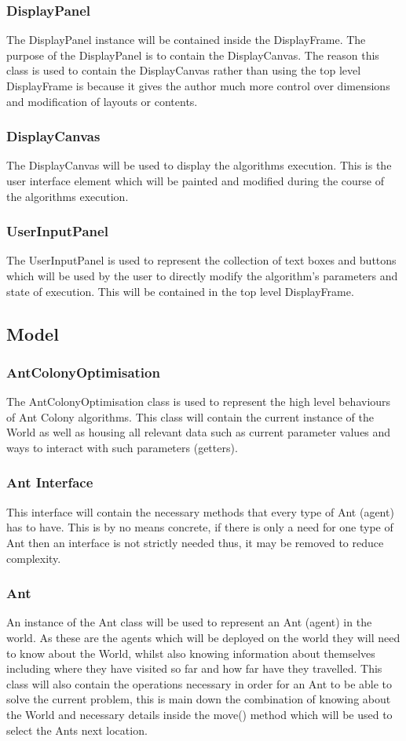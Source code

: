 \subsubsection{DisplayPanel}
The DisplayPanel instance will be contained inside the DisplayFrame. The purpose of the DisplayPanel is to contain the DisplayCanvas. The reason this class is used to contain the DisplayCanvas rather than using the top level DisplayFrame is because it gives the author much more control over dimensions and modification of layouts or contents.
\subsubsection{DisplayCanvas}
The DisplayCanvas will be used to display the algorithms execution. This is the user interface element which will be painted and modified during the course of the algorithms execution.
\subsubsection{UserInputPanel}
The UserInputPanel is used to represent the collection of text boxes and buttons which will be used by the user to directly modify the algorithm’s parameters and state of execution. This will be contained in the top level DisplayFrame.

\subsection{Model}
\subsubsection{AntColonyOptimisation}
The AntColonyOptimisation class is used to represent the high level behaviours of Ant Colony algorithms. This class will contain the current instance of the World as well as housing all relevant data such as current parameter values and ways to interact with such parameters (getters).
\subsubsection{Ant Interface}
This interface will contain the necessary methods that every type of Ant (agent) has to have. This is by no means concrete, if there is only a need for one type of Ant then an interface is not strictly needed thus, it may be removed to reduce complexity.
\subsubsection{Ant}
An instance of the Ant class will be used to represent an Ant (agent) in the world. As these are the agents which will be deployed on the world they will need to know about the World, whilst also knowing information about themselves including where they have visited so far and how far have they travelled. This class will also contain the operations necessary in order for an Ant to be able to solve the current problem, this is main down the combination of knowing about the World and necessary details inside the move() method which will be used to select the Ants next location.
